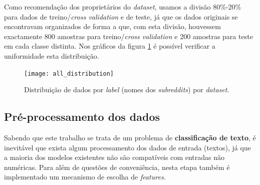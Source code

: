 Como recomendação dos proprietários do \textit{dataset}, usamos a divisão 80\%-20\% para dados de treino/\textit{cross validation} e de teste, já que os dados originais se encontravam organizados de forma a que, com esta divisão, houvessem exactamente 800 amostras para treino/\textit{cross validation} e 200 amostras para teste em cada classe distinta. Nos gráficos da figura \ref{fig:data_distribution} é possível verificar a uniformidade esta distribuição.


\begin{figure}[!t]
	\centering
	\texttt{[image: all\_distribution]}
	\caption{Distribuição de dados por \textit{label} (nomes dos \textit{subreddits}) por \textit{dataset}.}
	\label{fig:data_distribution}
\end{figure}


\subsection{Pré-processamento dos dados}
\label{subsub:data_pre_processing}

Sabendo que este trabalho se trata de um problema de \textbf{classificação de texto}, é inevitável que exista algum processamento dos dados de entrada (textos), já que a maioria dos modelos existentes não são compatíveis com entradas não numéricas. Para além de questões de conveniência, nesta etapa também é implementado um mecanismo de escolha de \textit{features}.

